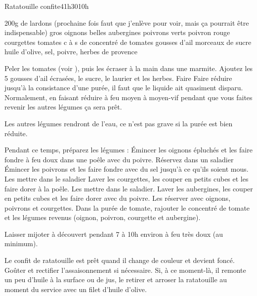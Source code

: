 \begin{recette}{Ratatouille confite}{4}{1h30}{10h}
\begin{ingredients}
\ingredient 200g de lardons (prochaine fois faut que j'enlève pour voir, mais ça pourrait être indispensable)
 gros oignons
 belles aubergines
 poivrons verts
 poivron rouge
 courgettes
 tomates
 c à s de concentré de tomates
 gousses d'ail
 morceaux de sucre
\ingredient huile d'olive, sel, poivre, herbes de provence
\end{ingredients}

\begin{preparation}
\etape Peler les tomates (voir ), puis les écraser à la main dans une marmite. Ajoutez les 5 gousses d'ail écrasées, le sucre, le laurier et les herbes. 
\etape Faire Faire réduire jusqu'à la consistance d'une purée, il faut que le liquide ait quasiment disparu. Normalement, en faisant réduire à feu moyen à moyen-vif pendant que vous faites revenir les autres légumes ça sera prêt. 
\begin{remarque}
Les autres légumes rendront de l'eau, ce n'est pas grave si la purée est bien réduite.
\end{remarque}
\etape Pendant ce temps, préparez les légumes : 
\etape Émincer les oignons épluchés et les faire fondre à feu doux dans une poêle avec du poivre. Réservez dans un saladier
\etape Émincer les poivrons et les faire fondre avec du sel jusqu'à ce qu'ils soient mous. Les mettre dans le saladier
\etape Laver les courgettes, les couper en petits cubes et les faire dorer à la poêle. Les mettre dans le saladier.
\etape Laver les aubergines, les couper en petits cubes et les faire dorer avec du poivre. Les réserver avec oignons, poivrons et courgettes.
\etape Dans la purée de tomate, rajouter le concentré de tomate et les légumes revenus (oignon, poivron, courgette et aubergine).
\end{preparation}

\begin{cuisson}
Laisser mijoter à découvert pendant 7 à 10h environ à feu très doux (au minimum). 

Le confit de ratatouille est prêt quand il change de couleur et devient foncé. Goûter et rectifier l'assaisonnement si nécessaire. Si, à ce moment-là, il remonte un peu d'huile à la surface ou de jus, le retirer et arroser la ratatouille au moment du service avec un filet d'huile d'olive.

\end{cuisson}
\end{recette}

